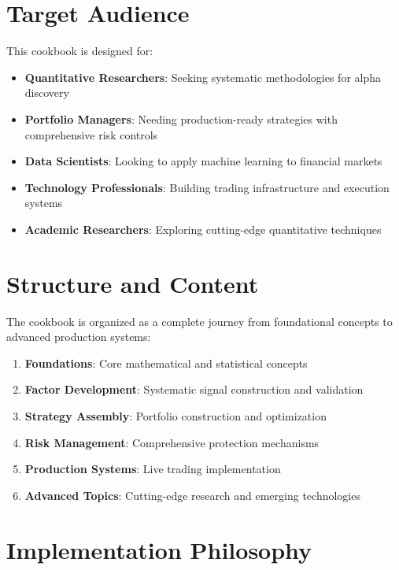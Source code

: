 \documentclass[11pt,letterpaper,openany]{book}
\begin{document}
\section*{Target Audience}

This cookbook is designed for:

\begin{itemize}
    \item \textbf{Quantitative Researchers}: Seeking systematic methodologies for alpha discovery
    \item \textbf{Portfolio Managers}: Needing production-ready strategies with comprehensive risk controls
    \item \textbf{Data Scientists}: Looking to apply machine learning to financial markets
    \item \textbf{Technology Professionals}: Building trading infrastructure and execution systems
    \item \textbf{Academic Researchers}: Exploring cutting-edge quantitative techniques
\end{itemize}

\section*{Structure and Content}

The cookbook is organized as a complete journey from foundational concepts to advanced production systems:

\begin{enumerate}
    \item \textbf{Foundations}: Core mathematical and statistical concepts
    \item \textbf{Factor Development}: Systematic signal construction and validation
    \item \textbf{Strategy Assembly}: Portfolio construction and optimization
    \item \textbf{Risk Management}: Comprehensive protection mechanisms
    \item \textbf{Production Systems}: Live trading implementation
    \item \textbf{Advanced Topics}: Cutting-edge research and emerging technologies
\end{enumerate}

\section*{Implementation Philosophy}
\end{document}
